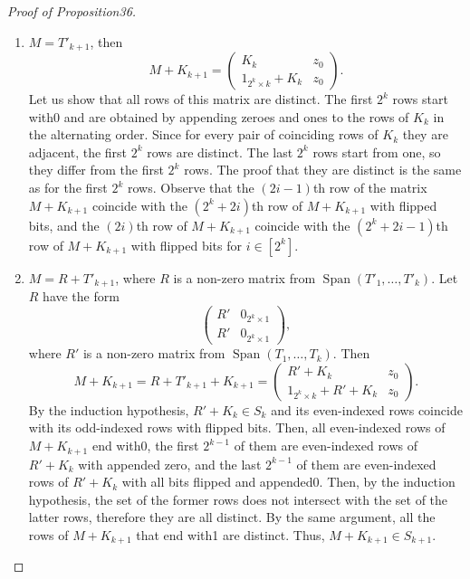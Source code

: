 \documentclass[10pt,a4paper]{article}
\begin{document}
\begin{proof}[Proof of Proposition36]
\begin{enumerate}
\[
M+K_{k+1}=\begin{pmatrix}M'+K_k&0_{2^k\times1}\\M'+K_k&1_{2^k\times1}\end{pmatrix};
\]
it follows from the induction hypothesis that all rows of this matrix are distinct, i.e. $M+K_{k+1}\in S_{k+1}$. In order to verify that the set of even-indexed rows of this matrix coincide with the set of odd-indexed rows with all bits flipped, observe that by induction hypothesis the first $2^{k-1}$ even-indexed rows of $M+K_{k+1}$ coincide with the last $2^{k-1}$ odd-indexed rows of $M+K_{k+1}$ with all bits flipped, and the first $2^{k-1}$ odd-indexed rows of $M+K_{k+1}$ coincide with the last $2^{k-1}$ even-indexed rows of $M+K_{k+1}$ with flipped bits.
\item $M=T'_{k+1}$, then
\[
M+K_{k+1}=\begin{pmatrix}K_k&z_0\\1_{2^k\times k}+K_k&z_0\end{pmatrix}.
\]
Let us show that all rows of this matrix are distinct. The first $2^k$ rows start with0 and are obtained by appending zeroes and ones to the rows of $K_k$ in the alternating order. Since for every pair of coinciding rows of $K_k$ they are adjacent, the first $2^k$ rows are distinct. The last $2^k$ rows start from one, so they differ from the first $2^k$ rows. The proof that they are distinct is the same as for the first $2^k$ rows. Observe that the $(2i-1)$th row of the matrix $M+K_{k+1}$ coincide with the $(2^k+2i)$th row of $M+K_{k+1}$ with flipped bits, and the $(2i)$th row of $M+K_{k+1}$ coincide with the $(2^k+2i-1)$th row of $M+K_{k+1}$ with flipped bits for $i\in[2^k]$.
\item $M=R+T'_{k+1}$, where $R$ is a non-zero matrix from $\operatorname{Span}(T'_1,\ldots,T'_k)$. Let $R$ have the form
\[
\begin{pmatrix}R'&0_{2^k\times1}\\R'&0_{2^k\times1}\end{pmatrix},
\]
where $R'$ is a non-zero matrix from $\operatorname{Span}(T_1,\ldots,T_k)$. Then
\[
M+K_{k+1}=R+T'_{k+1}+K_{k+1}
=\begin{pmatrix}R'+K_k&z_0\\1_{2^k\times k}+R'+K_k&z_0\end{pmatrix}.
\]
By the induction hypothesis, $R'+K_k\in S_k$ and its even-indexed rows coincide with its odd-indexed rows with flipped bits. Then, all even-indexed rows of $M+K_{k+1}$ end with0, the first $2^{k-1}$ of them are even-indexed rows of $R'+K_k$ with appended zero, and the last $2^{k-1}$ of them are even-indexed rows of $R'+K_k$ with all bits flipped and appended0. Then, by the induction hypothesis, the set of the former rows does not intersect with the set of the latter rows, therefore they are all distinct. By the same argument, all the rows of $M+K_{k+1}$ that end with1 are distinct. Thus, $M+K_{k+1}\in S_{k+1}$.

\end{enumerate}
\end{proof}
\end{document}
